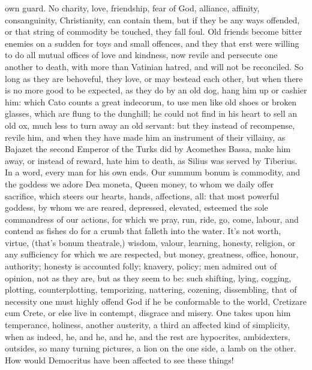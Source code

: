 {own guard. No charity, love, friendship, fear of God, alliance,
affinity, consanguinity, Christianity, can contain them, but if they be
any ways offended, or that string of commodity be touched, they fall
foul. Old friends become bitter enemies on a sudden for toys and small
offences, and they that erst were willing to do all mutual offices of
love and kindness, now revile and persecute one another to death, with
more than Vatinian hatred, and will not be reconciled. So long as they
are behoveful, they love, or may bestead each other, but when there is
no more good to be expected, as they do by an old dog, hang him up or
cashier him: which  Cato counts a great indecorum, to use men like
old shoes or broken glasses, which are flung to the dunghill; he could
not find in his heart to sell an old ox, much less to turn away an old
servant: but they instead of recompense, revile him, and when they have
made him an instrument of their villainy, as Bajazet the second
Emperor of the Turks did by Acomethes Bassa, make him away, or instead
of reward, hate him to death, as Silius was served by Tiberius. In
a word, every man for his own ends. Our summum bonum is commodity, and
the goddess we adore Dea moneta, Queen money, to whom we daily offer
sacrifice, which steers our hearts, hands, affections, all: that
most powerful goddess, by whom we are reared, depressed, elevated,
esteemed the sole commandress of our actions, for which we pray,
run, ride, go, come, labour, and contend as fishes do for a crumb that
falleth into the water. It's not worth, virtue, (that's bonum
theatrale,) wisdom, valour, learning, honesty, religion, or any
sufficiency for which we are respected, but money, greatness,
office, honour, authority; honesty is accounted folly; knavery, policy;
men admired out of opinion, not as they are, but as they seem to
be: such shifting, lying, cogging, plotting, counterplotting,
temporizing, nattering, cozening, dissembling, that of necessity
one must highly offend God if he be conformable to the world, Cretizare
cum Crete, or else live in contempt, disgrace and misery. One takes
upon him temperance, holiness, another austerity, a third an affected
kind of simplicity, when as indeed, he, and he, and he, and the rest
are hypocrites, ambidexters, outsides, so many turning pictures, a
lion on the one side, a lamb on the other. How would Democritus
have been affected to see these things!

}
